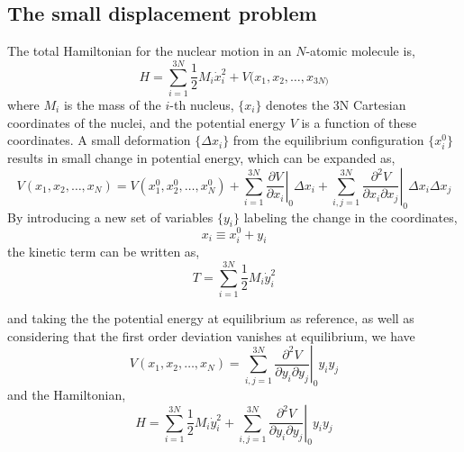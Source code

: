 \documentclass[a4paper,notitlepage,preprint]{revtex4-1}
\begin{document}
\subsection{The small displacement problem}
The total Hamiltonian for the nuclear motion in an $N$-atomic molecule is,
\begin{equation}
	H = \sum_{i=1}^{3N} \frac{1}{2}M_i \dot{x}_i^2 + V(x_1, x_2, \dots, x_{3N)}
	\label{eq:H1}
\end{equation}
\noindent where $M_i$ is the mass of the $i$-th nucleus, $\{x_i\}$ denotes the 3N Cartesian coordinates of the nuclei, and the potential energy $V$ is a function of these coordinates. A small deformation $\{\Delta x_i\}$ from the equilibrium configuration $\{x_i^0\}$ results in small change in potential energy, which can be expanded as,
\begin{equation}
	V(x_1, x_2, \dots, x_N) = V(x_1^0, x_2^0, \dots, x_N^0) + \sum_{i=1}^{3N} \left.\frac{\partial V}{\partial x_i}\right\vert_0\Delta x_i + \sum_{i,j = 1}^{3N} \left. \frac{\partial^2 V}{\partial x_i \partial x_j} \right\vert_0 \Delta x_i \Delta x_j
	\label{eq:Vexpand}
\end{equation}
\noindent By introducing a new set of variables $\{y_i\}$ labeling the change in the coordinates, 
\begin{equation}
	x_i \equiv x_i^0 + y_i
	\label{eq:x_to_y}
\end{equation}
\noindent the kinetic term can be written as,
\begin{equation}
	T = \sum_{i=1}^{3N} \frac{1}{2}M_i \dot{y}_i^2
	\label{eq:T}
\end{equation}


\noindent and taking the the potential energy at equilibrium as reference, as well as considering that the first order deviation vanishes at equilibrium, we have
\begin{equation}
	V(x_1, x_2, \dots, x_N) = \sum_{i,j = 1}^{3N}\left. \frac{\partial^2 V}{\partial y_i \partial y_j} \right\vert_0 y_i y_j
	\label{eq:Vy}
\end{equation}
\noindent and the Hamiltonian,
\begin{equation}
	H =  \sum_{i=1}^{3N} \frac{1}{2}M_i \dot{y}_i^2 + \sum_{i,j = 1}^{3N}\left. \frac{\partial^2 V}{\partial y_i \partial y_j} \right\vert_0 y_i y_j
	\label{eq:Hy}
\end{equation}
\end{document}
